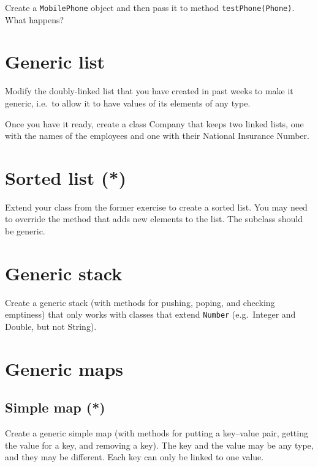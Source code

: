 \documentclass{article}
\begin{document}
Create a \verb+MobilePhone+ object and then pass it to method
\verb+testPhone(Phone)+. What happens?

\section{Generic list}
\label{sec:generic-list}

Modify the doubly-linked list that you have created in past weeks to make it
generic, i.e.~to allow it to have values of its elements of any
type. 

Once you have it ready, create a class Company that keeps two linked
lists, one with the names of the employees and one with their National
Insurance Number. 

\section{Sorted list (*)}
\label{sec:sorted-list}

Extend your class from the former exercise to create a sorted
list. You may need to override the method that adds new elements to
the list. The subclass should be generic. 



\section{Generic stack}
\label{sec:generic-stack}

Create a generic stack (with methods for pushing, poping, and checking
emptiness) that only works with classes that extend \verb+Number+
(e.g.~Integer and Double, but not String). 

\section{Generic maps}
\label{sec:generic-map}

\subsection{Simple map (*)}
\label{sec:array-based-impl2}

Create a generic simple map (with methods for putting a key--value pair,
getting the value for a key, and removing a key). The key and the
value may be any type, and they may be different. Each key can only be
linked to one value. 
\end{document}
